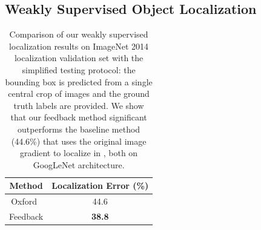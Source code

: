 \subsection{Weakly Supervised Object Localization}
\label{subsec:localization}

\begin{table}[htb]
\centering
\small
\begin{tabular}{|c|c|}
\hline
Method & Localization Error (\%) \\ \hline
Oxford~\cite{simonyan2013deep} & 44.6 \\ \hline
Feedback & \textbf{38.8} \\ \hline
\end{tabular}
\caption{Comparison of our weakly supervised localization results on ImageNet 2014 localization validation set with the simplified testing protocol: the bounding box is predicted from a single central crop of images and the ground truth labels are provided.
We show that our feedback method significant outperforms the baseline method (44.6\%) that uses the original image gradient to localize in \cite{simonyan2013deep}, both on GoogLeNet architecture.
}
\label{tab:localization_accuracy}
\end{table}

